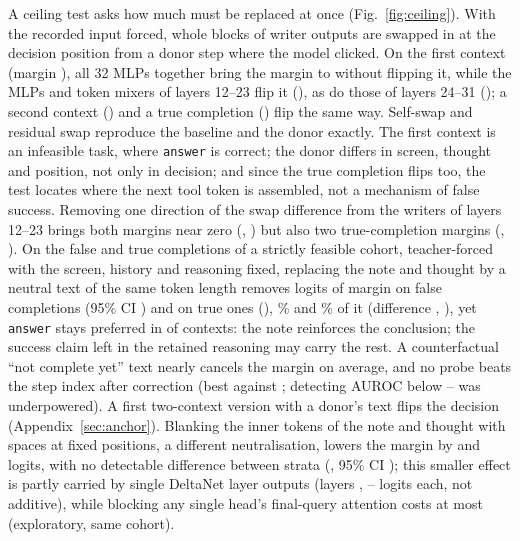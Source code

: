 A ceiling test asks how much must be replaced at once (Fig.~\ref{fig:ceiling}). With the recorded input forced, whole blocks of writer outputs are swapped in at the decision position from a donor step where the model clicked. On the first \fsp{} context (margin \ceilBase), all 32 MLPs together bring the margin to \ceilMlpAll{} without flipping it, while the MLPs and token mixers of layers 12--23 flip it (\ceilBothMiddle), as do those of layers 24--31 (\ceilBothLate); a second \fsp{} context (\ceilSecBothMiddle) and a true completion (\ceilTrueBothMiddle) flip the same way. Self-swap and residual swap reproduce the baseline and the donor exactly. The first context is an infeasible task, where \texttt{answer} is correct; the donor differs in screen, thought and position, not only in decision; and since the true completion flips too, the test locates where the next tool token is assembled, not a mechanism of false success. Removing one direction of the swap difference from the writers of layers 12--23 brings both \fsp{} margins near zero (\projOneFspA, \projOneFspB) but also two true-completion margins (\projOneTrueA, \projOneTrueB). On the \paFsN{} false and \paTrueN{} true completions of a strictly feasible cohort, teacher-forced with the screen, history and reasoning fixed, replacing the note and thought by a neutral text of the same token length removes \paNeutralFs{} logits of margin on false completions (95\% CI \paNeutralFsCi) and \paNeutralTrue{} on true ones (\paNeutralTrueCi), \paFracFs\% and \paFracTrue\% of it (difference \paInter, \paInterCi), yet \texttt{answer} stays preferred in \paNeutralPosAll{} of \paN{} contexts: the note reinforces the conclusion; the success claim left in the retained reasoning may carry the rest. A counterfactual ``not complete yet'' text nearly cancels the margin on average, and no probe beats the step index after correction (best \paBestAuc{} against \paStepAuc; detecting AUROC below \paPowOne--\paPowTwo{} was underpowered). A first two-context version with a donor's text flips the decision (Appendix~\ref{sec:anchor}). Blanking the inner tokens of the note and thought with spaces at fixed positions, a different neutralisation, lowers the margin by \mlNeutralFs{} and \mlNeutralTrue{} logits, with no detectable difference between strata (\mlNeutralSel, 95\% CI \mlNeutralSelCi); this smaller effect is partly carried by single DeltaNet layer outputs (layers \mlDeltaTopLayers, \mlDeltaTopMin--\mlDeltaTopMax{} logits each, not additive), while blocking any single head's final-query attention costs at most \mlHeadMaxAny{} (exploratory, same cohort).

